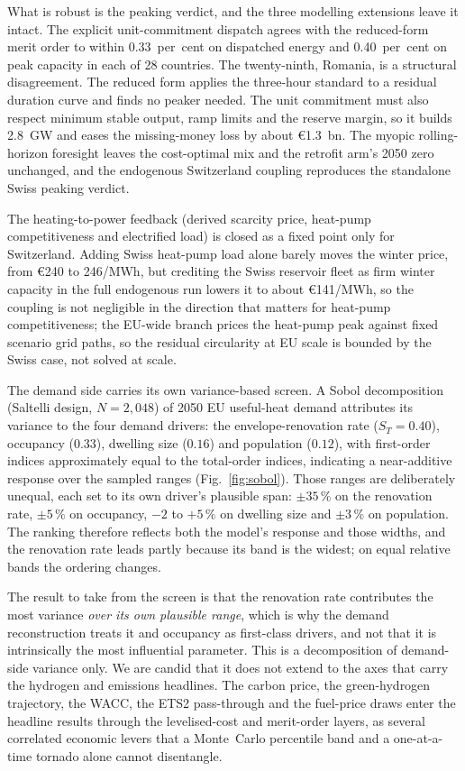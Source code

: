 What is robust is the peaking verdict, and the three
modelling extensions leave it intact. The explicit unit-commitment dispatch
agrees with the reduced-form merit order to within 0.33~per~cent on dispatched energy
and 0.40~per~cent on peak capacity in each of 28 countries. The twenty-ninth, Romania, is a structural disagreement. The reduced form applies the three-hour standard to a residual
duration curve and finds no peaker needed. The unit commitment must also respect minimum
stable output, ramp limits and the reserve margin, so it builds 2.8~GW and eases the
missing-money loss by about \euro{}1.3~bn. The myopic rolling-horizon foresight leaves
the cost-optimal mix and the retrofit arm's 2050 zero unchanged, and the endogenous
Switzerland coupling reproduces the standalone Swiss peaking verdict.

The heating-to-power feedback (derived scarcity price, heat-pump competitiveness and electrified
load) is closed as a fixed point only for Switzerland. Adding Swiss heat-pump load
alone barely moves the winter price, from \euro{}240 to 246/MWh, but crediting the
Swiss reservoir fleet as firm winter capacity in the full endogenous run lowers it to
about \euro{}141/MWh, so the coupling is not negligible in the direction that matters
for heat-pump competitiveness; the EU-wide branch prices the heat-pump peak
against fixed scenario grid paths, so the residual circularity at EU scale is bounded
by the Swiss case, not solved at scale.

The demand side carries its own variance-based screen. A Sobol decomposition (Saltelli
design, $N=2{,}048$) of 2050 EU useful-heat demand attributes its variance to the four
demand drivers: the envelope-renovation rate ($S_T=0.40$), occupancy ($0.33$), dwelling
size ($0.16$) and population ($0.12$), with first-order indices approximately equal to
the total-order indices, indicating a near-additive response over the sampled ranges
(Fig.~\ref{fig:sobol}). Those ranges are deliberately unequal, each set to its own
driver's plausible span: $\pm 35\,\%$ on the renovation rate, $\pm 5\,\%$ on occupancy,
$-2$ to $+5\,\%$ on dwelling size and $\pm 3\,\%$ on population. The ranking therefore
reflects both the model's response and those widths, and the renovation rate leads
partly because its band is the widest; on equal relative bands the ordering changes.

The result to take from the screen is that the renovation rate contributes the most
variance \emph{over its own plausible range}, which is why the demand reconstruction
treats it and occupancy as first-class drivers, and not that it is intrinsically the
most influential parameter. This is a decomposition of demand-side variance only. We are
candid that it does not extend to the axes that carry the hydrogen and emissions
headlines. The carbon price, the green-hydrogen trajectory, the WACC, the ETS2
pass-through and the fuel-price draws enter the headline results through the
levelised-cost and merit-order layers, as several correlated economic levers that a
Monte~Carlo percentile band and a one-at-a-time tornado alone cannot disentangle.

